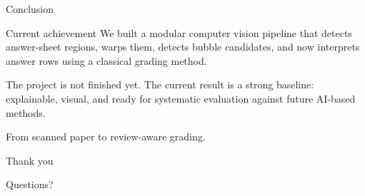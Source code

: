 \documentclass[aspectratio=169]{beamer}
\begin{document}
\begin{frame}{Conclusion}
  \begin{block}{Current achievement}
    We built a modular computer vision pipeline that detects answer-sheet regions, warps them, detects bubble candidates, and now interprets answer rows using a classical grading method.
  \end{block}

  \vspace{0.25cm}

  The project is not finished yet. The current result is a strong baseline: explainable, visual, and ready for systematic evaluation against future AI-based methods.

  \vspace{0.3cm}

  \centering
  \Large From scanned paper to review-aware grading.
\end{frame}

\begin{frame}
  \centering
  \Huge Thank you

  \vspace{0.45cm}

  \Large Questions?
\end{frame}
\end{document}
